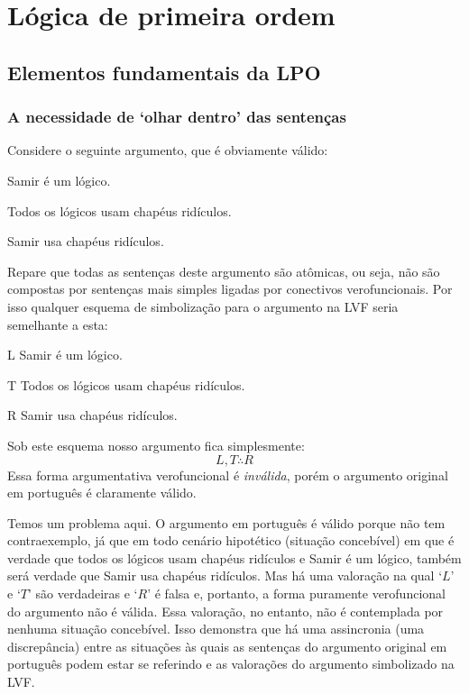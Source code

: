 \normalsize
\part{Lógica de primeira ordem}
\label{ch.FOL}
\chapter{Elementos fundamentais da LPO}\label{s:FOLBuildingBlocks}

\section[Olhar dentro das sentenças]{A necessidade de `olhar dentro' das sentenças}
Considere o seguinte argumento, que é obviamente válido:
\begin{earg}\label{willard1}
	\item[] Samir é um lógico.
	\item[] Todos os lógicos usam chapéus ridículos.
	\item[\therefore] Samir usa chapéus ridículos.
\end{earg}
Repare que todas as sentenças deste argumento são atômicas, ou seja, não são compostas por sentenças mais simples ligadas por conectivos verofuncionais.
Por isso qualquer esquema de simbolização para o argumento na LVF seria semelhante a esta:
\begin{ekey}
\item[L] Samir é um lógico.
\item[T] Todos os lógicos usam chapéus ridículos.
\item[R] Samir usa chapéus ridículos.
\end{ekey}
Sob este esquema nosso argumento fica simplesmente:
$$L, T \therefore R$$
Essa forma argumentativa verofuncional é \emph{inválida}, porém o argumento original em português é claramente válido.

Temos um problema aqui.
O argumento em português é válido porque não tem contraexemplo, já que em todo cenário hipotético (situação concebível) em que é verdade que todos os lógicos usam chapéus ridículos e Samir é um lógico, também será verdade que Samir usa chapéus ridículos.
Mas há uma valoração na qual `$L$' e `$T$' são verdadeiras e `$R$' é falsa e, portanto, a forma puramente verofuncional do argumento não é válida.
Essa valoração, no entanto, não é contemplada por nenhuma situação concebível.
Isso demonstra que há uma assincronia (uma discrepância) entre as situações às quais as sentenças do  argumento original em português podem estar se referindo e as valorações do argumento simbolizado na LVF.

